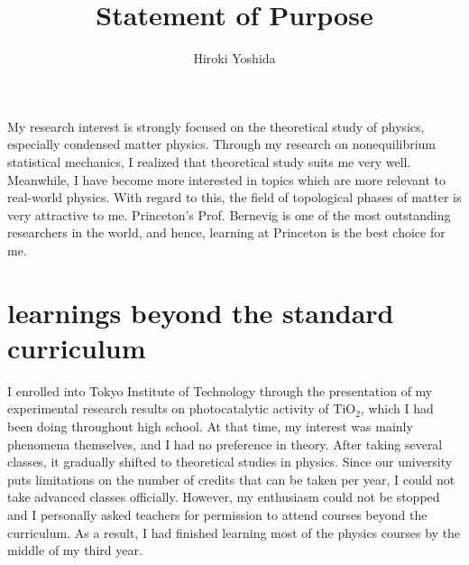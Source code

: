 \documentclass[a4]{article}
\title{Statement of Purpose}
\author{Hiroki Yoshida}
\date{}
\begin{document}
\maketitle

My research interest is strongly focused on the theoretical study of physics, especially condensed matter physics. Through my research on nonequilibrium statistical mechanics, I realized that theoretical study suits me very well. Meanwhile, I have become more interested in topics which are more relevant to real-world physics. With regard to this, the field of topological phases of matter is very attractive to me. Princeton's Prof. Bernevig is one of the most outstanding researchers in the world, and hence, learning at Princeton is the best choice for me.\par

\section{learnings beyond the standard curriculum}
I enrolled into Tokyo Institute of Technology through the presentation of my experimental research results on photocatalytic activity of TiO$_2$, which I had been doing throughout high school. At that time, my interest was mainly phenomena themselves, and I had no preference in theory. After taking several classes, it gradually shifted to theoretical studies in physics. Since our university puts limitations on the number of credits that can be taken per year, I could not take advanced classes officially. However, my enthusiasm could not be stopped and I personally asked teachers for permission to attend courses beyond the curriculum. As a result, I had finished learning most of the physics courses by the middle of my third year.\par
\end{document}

